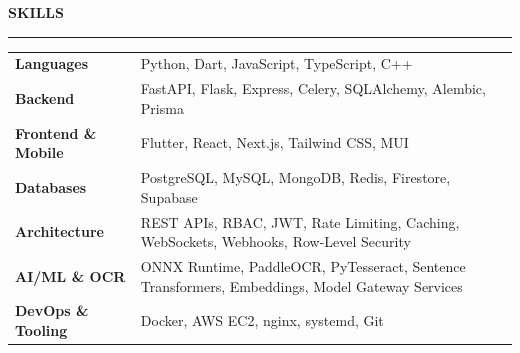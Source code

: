 \documentclass{resume}
\renewenvironment{rSection}[1]{
    \vspace{8pt}
    \noindent
    {\bfseries\MakeUppercase{#1}}
    \par
    \vspace{-3.5pt}
    \noindent\rule{\textwidth}{0.4pt}
    \par
    \vspace{4pt}
}{
    \vspace{3pt}
}
\begin{document}
\begin{rSection}{SKILLS}

\vspace{-2pt}

\begin{tabularx}{\textwidth}{
    @{}
    >{\bfseries}p{1.6in}
    X
    @{}
}
Languages &
Python, Dart, JavaScript, TypeScript, C++ \\

Backend &
FastAPI, Flask, Express, Celery, SQLAlchemy, Alembic, Prisma \\

Frontend \& Mobile &
Flutter, React, Next.js, Tailwind CSS, MUI \\

Databases &
PostgreSQL, MySQL, MongoDB, Redis, Firestore, Supabase \\

Architecture &
REST APIs, RBAC, JWT, Rate Limiting, Caching, WebSockets, Webhooks, Row-Level Security \\

AI/ML \& OCR &
ONNX Runtime, PaddleOCR, PyTesseract, Sentence Transformers, Embeddings, Model Gateway Services \\

DevOps \& Tooling &
Docker, AWS EC2, nginx, systemd, Git \\
\end{tabularx}

\end{rSection}

\end{document}
